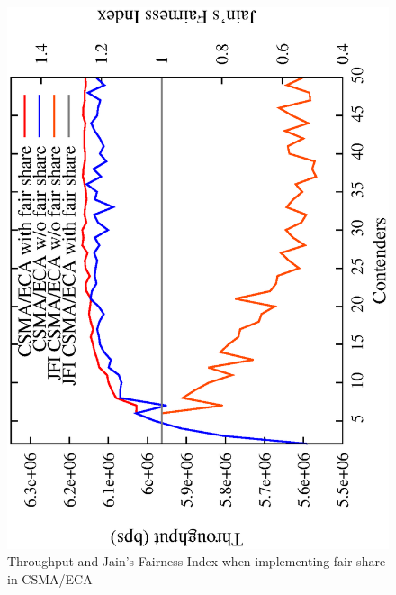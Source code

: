 


\begin{figure}[htbp]
  \centering
  \includegraphics[width=0.7\linewidth, angle = -90]{figures/throughput/CSMA-E2CA_w_fairShare.eps}
  \caption{Throughput and Jain's Fairness Index when implementing fair share in CSMA/ECA
  \label{fig:fairShare}}
\end{figure}

